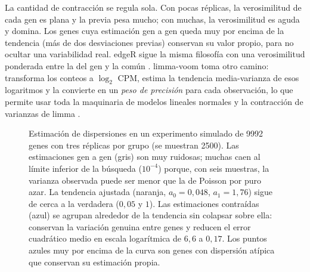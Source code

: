 La cantidad de contracción se regula sola. Con pocas réplicas, la verosimilitud de cada gen es plana y la previa pesa mucho; con muchas, la verosimilitud es aguda y domina. Los genes cuya estimación gen a gen queda muy por encima de la tendencia (más de dos desviaciones previas) conservan su valor propio, para no ocultar una variabilidad real. edgeR sigue la misma filosofía con una verosimilitud ponderada entre la del gen y la común \parencite{c11-robinson2010edger}. limma-voom toma otro camino: transforma los conteos a $\log_2$ CPM, estima la tendencia media-varianza de esos logaritmos y la convierte en un \emph{peso de precisión} para cada observación, lo que permite usar toda la maquinaria de modelos lineales normales y la contracción de varianzas de limma \parencite{c11-law2014,c11-ritchie2015}.

\begin{figure}[t]
\centering
{}
\caption[Contracción de dispersiones]{Estimación de dispersiones en un experimento simulado de \num{9992} genes con tres réplicas por grupo (se muestran \num{2500}). Las estimaciones gen a gen (gris) son muy ruidosas; muchas caen al límite inferior de la búsqueda ($10^{-4}$) porque, con seis muestras, la varianza observada puede ser menor que la de Poisson por puro azar. La tendencia ajustada (naranja, $a_0=0{,}048$, $a_1=1{,}76$) sigue de cerca a la verdadera ($0{,}05$ y $1$). Las estimaciones contraídas (azul) se agrupan alrededor de la tendencia sin colapsar sobre ella: conservan la variación genuina entre genes y reducen el error cuadrático medio en escala logarítmica de $6{,}6$ a $0{,}17$. Los puntos azules muy por encima de la curva son genes con dispersión atípica que conservan su estimación propia.}
\label{fig:11-dispersion}
\end{figure}

